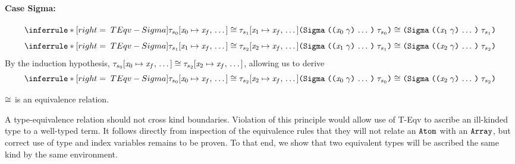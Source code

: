 \begin{sproof}
  \paragraph{Case {\sc Sigma}:}
  \[\infr[TEqv-Sigma]
  {\teqv
    {\seqsubst{\type_{s_0}}{\var_0}{\var_f}}
    {\seqsubst{\type_{s_1}}{\var_1}{\var_f}}}
  {\teqv
    {\typedsum{\sequence{\notevar{\var_0}{\sort}}}{\type_{s_0}}}
    {\typedsum{\sequence{\notevar{\var_1}{\sort}}}{\type_{s_1}}}}\]
  \ctrand
  \[\infr[TEqv-Sigma]
  {\teqv
    {\seqsubst{\type_{s_1}}{\var_1}{\var_f}}
    {\seqsubst{\type_{s_2}}{\var_2}{\var_f}}}
  {\teqv
    {\typedsum{\sequence{\notevar{\var_1}{\sort}}}{\type_{s_1}}}
    {\typedsum{\sequence{\notevar{\var_2}{\sort}}}{\type_{s_2}}}}\]
  By the induction hypothesis,
  $\mathit{\tau}_{s_0}\hspace{-2pt}\left[ \mathit{x}_0 \mapsto \mathit{x}_f, \, \ldots \, \right] \cong \mathit{\tau}_{s_2}\hspace{-2pt}\left[ \mathit{x}_2 \mapsto \mathit{x}_f, \, \ldots \, \right]$,
  allowing us to derive
  \[\infr[TEqv-Sigma]
  {\teqv
    {\seqsubst{\type_{s_0}}{\var_0}{\var_f}}
    {\seqsubst{\type_{s_2}}{\var_2}{\var_f}}}
  {\teqv
    {\typedsum{\sequence{\notevar{\var_0}{\sort}}}{\type_{s_0}}}
    {\typedsum{\sequence{\notevar{\var_2}{\sort}}}{\type_{s_2}}}}\]
\end{sproof}

\begin{theorem}
  \label{EqvTEqv}
  $\cong$ is an equivalence relation.
\end{theorem}

A type-equivalence relation should not cross kind boundaries.
Violation of this principle would allow
use of {\sc T-Eqv} to ascribe an ill-kinded type to a well-typed term.
It follows directly from inspection of the equivalence rules that
they will not relate an $\text{\tt Atom}$ with an $\text{\tt Array}$,
but correct use of type and index variables remains to be proven.
To that end, we show that two equivalent types
will be ascribed the same kind by the same environment.


